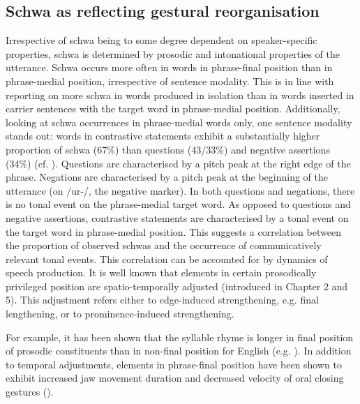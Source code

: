 \subsection{Schwa as reflecting gestural reorganisation}
Irrespective of schwa being to some degree dependent on speaker-specific properties, schwa is determined by prosodic and intonational properties of the utterance. Schwa occurs more often in words in phrase-final position than in phrase-medial position, irrespective of sentence modality. This is in line with \citet{Ridouane2008} reporting on more schwa in words produced in isolation than in words inserted in carrier sentences with the target word in phrase-medial position. Additionally, looking at schwa occurrences in phrase-medial words only, one sentence modality stands out: words in contrastive statements exhibit a substantially higher proportion of schwa (67\%) than questions (43/33\%) and negative assertions (34\%) (cf. ). Questions are characterised by a pitch peak at the right edge of the phrase. Negations are characterised by a pitch peak at the beginning of the utterance (on /ur-/, the negative marker). In both questions and negations, there is no tonal event on the phrase-medial target word. As opposed to questions and negative assertions, contrastive statements are characterised by a tonal event on the target word in phrase-medial position. This suggests a correlation between the proportion of observed schwas and the occurrence of communicatively relevant tonal events. This correlation can be accounted for by dynamics of speech production. It is well known that elements in certain prosodically privileged position are spatio-temporally adjusted (introduced in Chapter 2 and 5). This adjustment refers either to edge-induced strengthening, e.g. final lengthening, or to prominence-induced strengthening. 

For example, it has been shown that the syllable rhyme is longer in final position of prosodic constituents than in non-final position for English (e.g. \citealt{TurkShattuck2007}). In addition to temporal adjustments, elements in phrase-final position have been shown to exhibit increased jaw movement duration and decreased velocity of oral closing gestures (\citealt{BeckmanEdwards1990,Edwards.etal1991}).  

